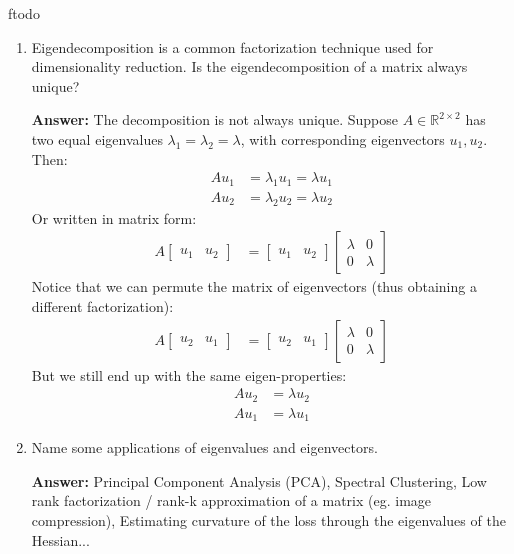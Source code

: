 ƒtodo\documentclass{article}
\newenvironment{QandA}{\begin{enumerate}[label=\arabic*.]}{\end{enumerate}}
\newenvironment{answer}{\par\normalfont \textbf{Answer:}}{}
\newcommand{\R}{\mathbb{R}}
\begin{document}
\begin{QandA}
    \item Eigendecomposition is a common factorization technique used for dimensionality reduction. Is the eigendecomposition of a matrix always unique?
    \begin{answer}
        The decomposition is not always unique. Suppose $A \in \R^{2 \times 2}$ has two equal eigenvalues $\lambda_1 = \lambda_2 = \lambda$, with corresponding eigenvectors $u_1, u_2$. Then:
        \begin{align*}
            A u_1 &= \lambda_1 u_1 = \lambda u_1 \\
            A u_2 &= \lambda_2 u_2 = \lambda u_2
        \end{align*}
        Or written in matrix form:
        \begin{align*}
            A \begin{bmatrix}
                u_1 & u_2
            \end{bmatrix}
             &= \begin{bmatrix}
                u_1 & u_2
            \end{bmatrix} 
            \begin{bmatrix}
                \lambda & 0 \\
                0 & \lambda
            \end{bmatrix}
        \end{align*}
        Notice that we can permute the matrix of eigenvectors (thus obtaining a different factorization):
        \begin{align*}
            A \begin{bmatrix}
                u_2 & u_1
            \end{bmatrix}
             &= \begin{bmatrix}
                u_2 & u_1
            \end{bmatrix} 
            \begin{bmatrix}
                \lambda & 0 \\
                0 & \lambda
            \end{bmatrix}
        \end{align*}
        But we still end up with the same eigen-properties:
        \begin{align*}
            A u_2 &= \lambda u_2 \\
            A u_1 &= \lambda u_1
        \end{align*}
    \end{answer}
    \item Name some applications of eigenvalues and eigenvectors.
    \begin{answer}
        Principal Component Analysis (PCA), Spectral Clustering, Low rank factorization / rank-k approximation of a matrix (eg. image compression), Estimating curvature of the loss through the eigenvalues of the Hessian... 
    \end{answer}


\end{QandA}
\end{document}
